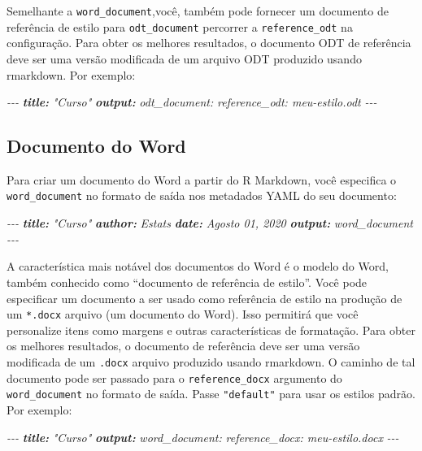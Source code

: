 \documentclass[
]{book}
\newenvironment{Shaded}{\begin{snugshade}}{\end{snugshade}}
\newcommand{\AnnotationTok}[1]{\textcolor[rgb]{0.56,0.35,0.01}{\textbf{\textit{#1}}}}
\newcommand{\CommentTok}[1]{\textcolor[rgb]{0.56,0.35,0.01}{\textit{#1}}}
\begin{document}
Semelhante a \texttt{word\_document},você, também pode fornecer um documento de referência de estilo para \texttt{odt\_document} percorrer a \texttt{reference\_odt} na configuração. Para obter os melhores resultados, o documento ODT de referência deve ser uma versão modificada de um arquivo ODT produzido usando rmarkdown. Por exemplo:

\begin{Shaded}
\begin{Highlighting}[]
\CommentTok{{-}{-}{-}}
\AnnotationTok{title:}\CommentTok{ "Curso"}
\AnnotationTok{output:}
\CommentTok{  odt\_document:}
\CommentTok{    reference\_odt: meu{-}estilo.odt}
\CommentTok{{-}{-}{-}}
\end{Highlighting}
\end{Shaded}

\hypertarget{documento-do-word}{%
\subsection{Documento do Word}\label{documento-do-word}}

Para criar um documento do Word a partir do R Markdown, você especifica o \texttt{word\_document} no formato de saída nos metadados YAML do seu documento:

\begin{Shaded}
\begin{Highlighting}[]
\CommentTok{{-}{-}{-}}
\AnnotationTok{title:}\CommentTok{ "Curso"}
\AnnotationTok{author:}\CommentTok{ Estats}
\AnnotationTok{date:}\CommentTok{ Agosto 01, 2020}
\AnnotationTok{output:}\CommentTok{ word\_document}
\CommentTok{{-}{-}{-}}
\end{Highlighting}
\end{Shaded}

A característica mais notável dos documentos do Word é o modelo do Word, também conhecido como ``documento de referência de estilo''. Você pode especificar um documento a ser usado como referência de estilo na produção de um \texttt{*.docx} arquivo (um documento do Word). Isso permitirá que você personalize itens como margens e outras características de formatação. Para obter os melhores resultados, o documento de referência deve ser uma versão modificada de um \texttt{.docx} arquivo produzido usando rmarkdown. O caminho de tal documento pode ser passado para o \texttt{reference\_docx} argumento do \texttt{word\_document} no formato de saída. Passe \texttt{"default"} para usar os estilos padrão. Por exemplo:

\begin{Shaded}
\begin{Highlighting}[]
\CommentTok{{-}{-}{-}}
\AnnotationTok{title:}\CommentTok{ "Curso"}
\AnnotationTok{output:}
\CommentTok{  word\_document:}
\CommentTok{    reference\_docx: meu{-}estilo.docx}
\CommentTok{{-}{-}{-}}
\end{Highlighting}
\end{Shaded}
\end{document}
